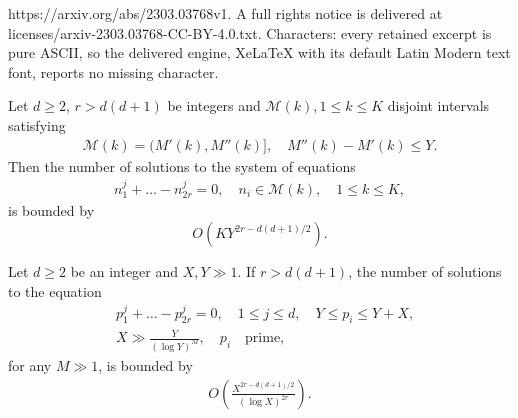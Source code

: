 \documentclass[10pt,a4paper]{amsart}
\def\cM{{\mathcal M}}
\def\ge{\geqslant}
\def\le{\leqslant}
\begin{document}
https://arxiv.org/abs/2303.03768v1. A full rights notice is delivered at licenses/arxiv-2303.03768-CC-BY-4.0.txt. Characters: every retained excerpt is pure ASCII, so the delivered engine, XeLaTeX with its default Latin Modern text font, reports no missing character.
\begin{corollary}
\label{eq:cor76867}
Let $d\ge 2$, $r>d(d+1)$ be integers and $\cM(k), 1\le k \le K$ disjoint intervals satisfying 
\begin{align*}
\cM(k)=(M'(k),M''(k)], \quad M''(k)-M'(k)\le Y.
\end{align*}
Then the number of solutions to the system of equations 
\begin{align}
\label{eq:system1}
n_1^{j}+\dots-n_{2r}^{j}=0, \quad n_i\in \cM(k), \quad 1\le k \le K,
\end{align}
is bounded by 
$$O(KY^{2r-d(d+1)/2}).$$
\end{corollary}

\begin{lemma}
\label{lem:vmvtP1}
Let $d\ge 2$ be an integer and $X, Y\gg 1$. If $r>d(d+1)$,  the number of solutions to the equation 
\begin{align*}
&p_1^{j}+\dots-p_{2r}^{j}=0, \quad 1\le j \le d, \quad Y\le p_i\le Y+X, \\ & X\gg\frac{Y}{(\log Y)^M}, \quad p_i \quad \text{prime},
\end{align*}
for any $M\gg1$, is bounded by 
\begin{align*}
O\left(\frac{X^{2r-d(d+1)/2}}{(\log{X})^{2r}}\right).
\end{align*}
\end{lemma}
\end{document}
